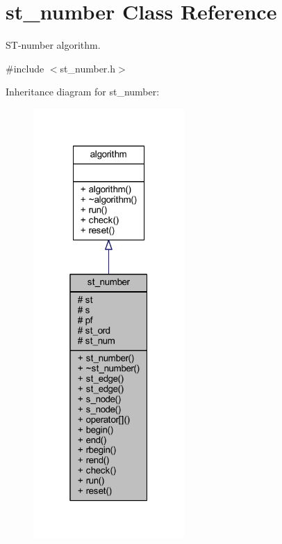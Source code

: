 \hypertarget{classst__number}{}\section{st\+\_\+number Class Reference}
\label{classst__number}


S\+T-\/number algorithm.  




{\ttfamily \#include $<$st\+\_\+number.\+h$>$}



Inheritance diagram for st\+\_\+number\+:\nopagebreak
\begin{figure}[H]
\begin{center}
\leavevmode
\includegraphics[width=163pt]{classst__number__inherit__graph}
\end{center}
\end{figure}


